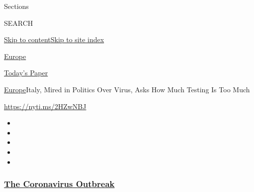 Sections

SEARCH

\protect\hyperlink{site-content}{Skip to
content}\protect\hyperlink{site-index}{Skip to site index}

\href{https://www.nytimes3xbfgragh.onion/section/world/europe}{Europe}

\href{https://myaccount.nytimes3xbfgragh.onion/auth/login?response_type=cookie\&client_id=vi}{}

\href{https://www.nytimes3xbfgragh.onion/section/todayspaper}{Today's
Paper}

\href{/section/world/europe}{Europe}\textbar{}Italy, Mired in Politics
Over Virus, Asks How Much Testing Is Too Much

\url{https://nyti.ms/2HZwNBJ}

\begin{itemize}
\item
\item
\item
\item
\item
\end{itemize}

\hypertarget{the-coronavirus-outbreak}{%
\subsubsection{\texorpdfstring{\href{https://www.nytimes3xbfgragh.onion/news-event/coronavirus?name=styln-coronavirus-national\&region=TOP_BANNER\&variant=undefined\&block=storyline_menu_recirc\&action=click\&pgtype=Article\&impression_id=c40f9610-e3ab-11ea-aee9-2d912d37c825}{The
Coronavirus
Outbreak}}{The Coronavirus Outbreak}}\label{the-coronavirus-outbreak}}

